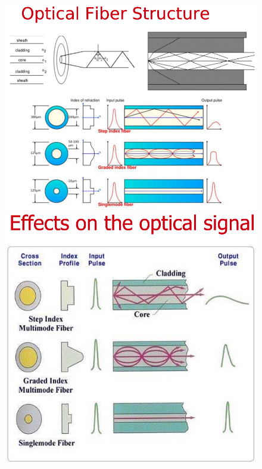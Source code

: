 \documentclass[8pt]{extarticle}
\begin{document}
\begin{figure}[H]
    \begin{minipage}[c]{\linewidth}
        \centering
        \begin{minipage}[l]{0.36\linewidth}
            \includegraphics[width=\linewidth]{images/FO3.png}
        \end{minipage}
        \hspace{0.04\linewidth}
        \begin{minipage}[l]{0.30\linewidth}
            \includegraphics[width=\linewidth]{images/FO4.png}
        \end{minipage}
    \end{minipage}
\end{figure}
\end{document}
